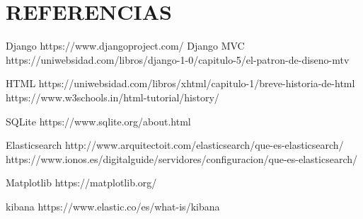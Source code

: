 \documentclass[11pt,a4paper]{book}
\begin{document}
	\chapter{REFERENCIAS}
	Django
https://www.djangoproject.com/
	Django MVC
https://uniwebsidad.com/libros/django-1-0/capitulo-5/el-patron-de-diseno-mtv

	HTML 
	https://uniwebsidad.com/libros/xhtml/capitulo-1/breve-historia-de-html
	https://www.w3schools.in/html-tutorial/history/
	
	SQLite
	https://www.sqlite.org/about.html
	
	Elasticsearch
	http://www.arquitectoit.com/elasticsearch/que-es-elasticsearch/
	https://www.ionos.es/digitalguide/servidores/configuracion/que-es-elasticsearch/
	
	Matplotlib
	https://matplotlib.org/
	
	kibana
	https://www.elastic.co/es/what-is/kibana
\end{document}

